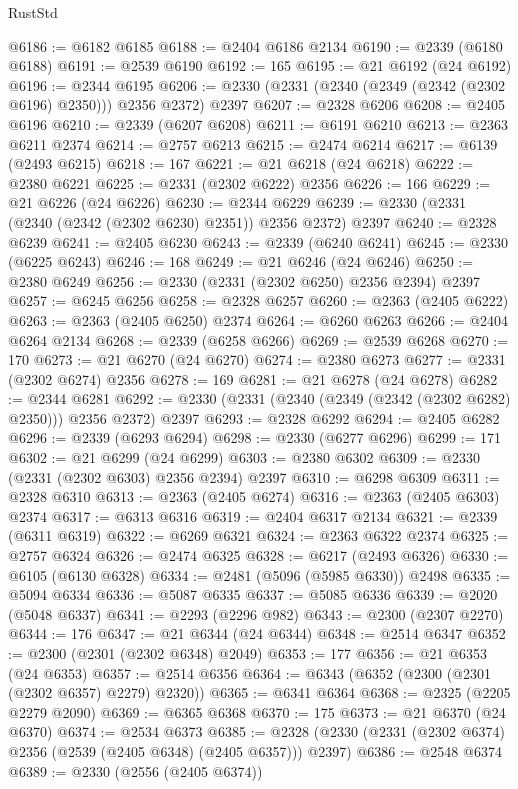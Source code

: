 \begin{lexlean}{RustStd}
\begin{coremodule}
@6186 := @6182 @6185
@6188 := @2404 @6186 @2134
@6190 := @2339 (@6180 @6188)
@6191 := @2539 @6190
@6192 := 165
@6195 := @21 @6192 (@24 @6192)
@6196 := @2344 @6195
@6206 := @2330 (@2331 (@2340 (@2349 (@2342 (@2302 @6196) @2350))) @2356 @2372) @2397
@6207 := @2328 @6206
@6208 := @2405 @6196
@6210 := @2339 (@6207 @6208)
@6211 := @6191 @6210
@6213 := @2363 @6211 @2374
@6214 := @2757 @6213
@6215 := @2474 @6214
@6217 := @6139 (@2493 @6215)
@6218 := 167
@6221 := @21 @6218 (@24 @6218)
@6222 := @2380 @6221
@6225 := @2331 (@2302 @6222) @2356
@6226 := 166
@6229 := @21 @6226 (@24 @6226)
@6230 := @2344 @6229
@6239 := @2330 (@2331 (@2340 (@2342 (@2302 @6230) @2351)) @2356 @2372) @2397
@6240 := @2328 @6239
@6241 := @2405 @6230
@6243 := @2339 (@6240 @6241)
@6245 := @2330 (@6225 @6243)
@6246 := 168
@6249 := @21 @6246 (@24 @6246)
@6250 := @2380 @6249
@6256 := @2330 (@2331 (@2302 @6250) @2356 @2394) @2397
@6257 := @6245 @6256
@6258 := @2328 @6257
@6260 := @2363 (@2405 @6222)
@6263 := @2363 (@2405 @6250) @2374
@6264 := @6260 @6263
@6266 := @2404 @6264 @2134
@6268 := @2339 (@6258 @6266)
@6269 := @2539 @6268
@6270 := 170
@6273 := @21 @6270 (@24 @6270)
@6274 := @2380 @6273
@6277 := @2331 (@2302 @6274) @2356
@6278 := 169
@6281 := @21 @6278 (@24 @6278)
@6282 := @2344 @6281
@6292 := @2330 (@2331 (@2340 (@2349 (@2342 (@2302 @6282) @2350))) @2356 @2372) @2397
@6293 := @2328 @6292
@6294 := @2405 @6282
@6296 := @2339 (@6293 @6294)
@6298 := @2330 (@6277 @6296)
@6299 := 171
@6302 := @21 @6299 (@24 @6299)
@6303 := @2380 @6302
@6309 := @2330 (@2331 (@2302 @6303) @2356 @2394) @2397
@6310 := @6298 @6309
@6311 := @2328 @6310
@6313 := @2363 (@2405 @6274)
@6316 := @2363 (@2405 @6303) @2374
@6317 := @6313 @6316
@6319 := @2404 @6317 @2134
@6321 := @2339 (@6311 @6319)
@6322 := @6269 @6321
@6324 := @2363 @6322 @2374
@6325 := @2757 @6324
@6326 := @2474 @6325
@6328 := @6217 (@2493 @6326)
@6330 := @6105 (@6130 @6328)
@6334 := @2481 (@5096 (@5985 @6330)) @2498
@6335 := @5094 @6334
@6336 := @5087 @6335
@6337 := @5085 @6336
@6339 := @2020 (@5048 @6337)
@6341 := @2293 (@2296 @982)
@6343 := @2300 (@2307 @2270)
@6344 := 176
@6347 := @21 @6344 (@24 @6344)
@6348 := @2514 @6347
@6352 := @2300 (@2301 (@2302 @6348) @2049)
@6353 := 177
@6356 := @21 @6353 (@24 @6353)
@6357 := @2514 @6356
@6364 := @6343 (@6352 (@2300 (@2301 (@2302 @6357) @2279) @2320))
@6365 := @6341 @6364
@6368 := @2325 (@2205 @2279 @2090)
@6369 := @6365 @6368
@6370 := 175
@6373 := @21 @6370 (@24 @6370)
@6374 := @2534 @6373
@6385 := @2328 (@2330 (@2331 (@2302 @6374) @2356 (@2539 (@2405 @6348) (@2405 @6357))) @2397)
@6386 := @2548 @6374
@6389 := @2330 (@2556 (@2405 @6374))

\end{coremodule}
\end{lexlean}
